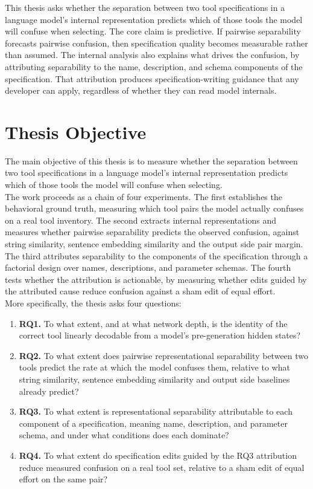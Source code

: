This thesis asks whether the separation between two tool specifications in a language model's internal representation predicts which of those tools the model will confuse when selecting. The core claim is predictive.
If pairwise separability forecasts pairwise confusion, then specification quality becomes measurable rather than assumed.
The internal analysis also explains what drives the confusion, by attributing separability to the name, description, and schema components of the specification.
That attribution produces specification-writing guidance that any developer can apply, regardless of whether they can read model internals.

\section{Thesis Objective}

The main objective of this thesis is to measure whether the separation between two tool specifications in a language model's internal representation predicts which of those tools the model will confuse when selecting. \\

The work proceeds as a chain of four experiments.
The first establishes the behavioral ground truth, measuring which tool pairs the model actually confuses on a real tool inventory.
The second extracts internal representations and measures whether pairwise separability predicts the observed confusion, against string similarity, sentence embedding similarity and the output side pair margin.
The third attributes separability to the components of the specification through a factorial design over names, descriptions, and parameter schemas.
The fourth tests whether the attribution is actionable, by measuring whether edits guided by the attributed cause reduce confusion against a sham edit of equal effort. \\

More specifically, the thesis asks four questions:

\begin{enumerate}
    \item \textbf{RQ1.} To what extent, and at what network depth, is the identity of the correct tool linearly decodable from a model's pre-generation hidden states?

    \item \textbf{RQ2.} To what extent does pairwise representational separability between two tools predict the rate at which the model confuses them, relative to what string similarity, sentence embedding similarity and output side baselines already predict?

    \item \textbf{RQ3.} To what extent is representational separability attributable to each component of a specification, meaning name, description, and parameter schema, and under what conditions does each dominate?

    \item \textbf{RQ4.} To what extent do specification edits guided by the RQ3 attribution reduce measured confusion on a real tool set, relative to a sham edit of equal effort on the same pair?
\end{enumerate}

